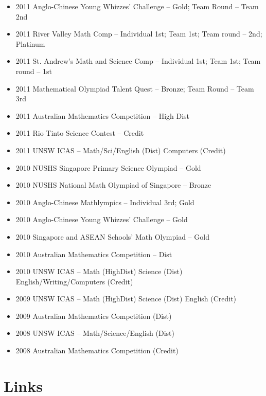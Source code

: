 \documentclass{article}
\begin{document}
{\begin{itemize}
\begin{itemize}
        \item 2011 Anglo-Chinese Young Whizzes' Challenge -- Gold; Team Round -- Team 2nd
        \item 2011 River Valley Math Comp -- Individual 1st; Team 1st; Team round -- 2nd; Platinum
        \item 2011 St. Andrew's Math and Science Comp -- Individual 1st; Team 1st; Team round -- 1st
        \item 2011 Mathematical Olympiad Talent Quest -- Bronze; Team Round -- Team 3rd
        \item 2011 Australian Mathematics Competition -- High Dist
        \item 2011 Rio Tinto Science Contest -- Credit
        \item 2011 UNSW ICAS -- Math/Sci/English (Dist) Computers (Credit)
        \item 2010 NUSHS Singapore Primary Science Olympiad -- Gold
        \item 2010 NUSHS National Math Olympiad of Singapore -- Bronze
        \item 2010 Anglo-Chinese Mathlympics -- Individual 3rd; Gold
        \item 2010 Anglo-Chinese Young Whizzes' Challenge -- Gold
        \item 2010 Singapore and ASEAN Schools' Math Olympiad -- Gold
        \item 2010 Australian Mathematics Competition -- Dist
        \item 2010 UNSW ICAS -- Math (HighDist) Science (Dist) English/Writing/Computers (Credit)
        \item 2009 UNSW ICAS -- Math (HighDist) Science (Dist) English (Credit)
        \item 2009 Australian Mathematics Competition (Dist)
        \item 2008 UNSW ICAS -- Math/Science/English (Dist)
        \item 2008 Australian Mathematics Competition (Credit)
    \end{itemize}
\end{itemize}

}


\section*{Links}
\end{document}
